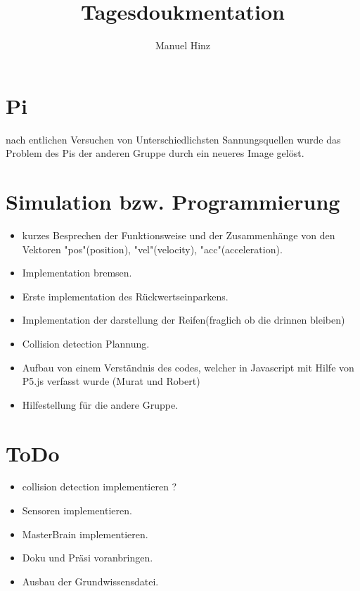 \documentclass{article}
\author{Manuel Hinz}
\title{Tagesdoukmentation}
\begin{document}
\maketitle

\section{Pi}

nach entlichen Versuchen von Unterschiedlichsten Sannungsquellen wurde das Problem des Pis der anderen Gruppe durch ein neueres Image gelöst.

\section{Simulation bzw. Programmierung}

\begin{itemize}

\item kurzes Besprechen der Funktionsweise und der Zusammenhänge von den Vektoren "pos"(position), "vel"(velocity), "acc"(acceleration).

\item Implementation bremsen.

\item Erste implementation des Rückwertseinparkens.

\item Implementation der darstellung der Reifen(fraglich ob die drinnen bleiben)

\item Collision detection Plannung.

\item Aufbau von einem Verständnis des codes, welcher in  Javascript mit Hilfe von P5.js verfasst wurde (Murat und Robert)

\item Hilfestellung für die andere Gruppe.

\end{itemize}

\section{ToDo}

\begin{itemize}

\item collision detection implementieren ?

\item Sensoren implementieren.

\item MasterBrain implementieren.

\item Doku und Präsi voranbringen.

\item Ausbau der Grundwissensdatei.

\end{itemize}
\end{document}
